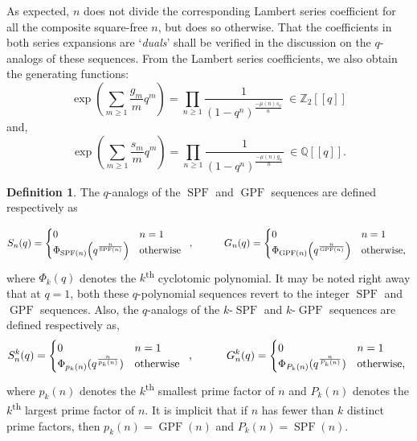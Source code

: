 \documentclass{article}
\numberwithin{equation}{section}
\theoremstyle{definition}
\newtheorem{definition}{\bf {Definition}}[section]
\begin{document}
As expected, $n$ does not divide the corresponding Lambert series coefficient for all the composite square-free $n$, but does so otherwise. That the coefficients in both series expansions are `\textit{duals}' shall be verified in the discussion on the $q$-analogs of these sequences. From the Lambert series coefficients, we also obtain the generating functions:  
\[\exp\left(\sum_{m\geq1}\frac{g_m}{m}q^m\right)=\prod_{n\geq1}\frac{1}{(1-q^n)^\frac{-\mu(n)s_n}{n}}\ \in \mathbb{Z}_{2}[[q]]\] 
and, 
\[\exp\left(\sum_{m\geq1}\frac{s_m}{m}q^m\right)=\prod_{n\geq1}\frac{1}{(1-q^n)^\frac{-\mu(n)g_n}{n}}\ \in \mathbb{Q}[[q]].\]


\begin{definition}
    The $q$-analogs of the $\operatorname{SPF}$ and $\operatorname{GPF}$ sequences are defined respectively as 
 
\[S_n(q)=\begin{cases}
        0 & n=1\\
        \Phi_{\operatorname{SPF}(n)}\!\left(q^\frac{n}{\operatorname{SPF}(n)}\right) & \text{otherwise}
    \end{cases}
\hspace{2mm}\text{, }\hspace{10mm}G_n(q)=\begin{cases}
        0 & n=1\\
        \Phi_{\operatorname{GPF}(n)}\!\left(q^\frac{n}{\operatorname{GPF}(n)}\right) & \text{otherwise}\text{, }
    \end{cases}\]
 where $\Phi_k(q)$ denotes the $k$\textsuperscript{th} cyclotomic polynomial. It may be noted right away that at $q=1$, both these $q$-polynomial sequences revert to the integer $\operatorname{SPF}$ and $\operatorname{GPF}$ sequences. Also, the $q$-analogs of the $k$-$\operatorname{SPF}$ and $k$-$\operatorname{GPF}$ sequences are defined respectively as, 
 \[S_n^k(q)=\begin{cases}
        0 & n=1\\
        \Phi_{p_k(n)}(q^\frac{n}{p_k(n)}) & \text{otherwise}
    \end{cases}
\hspace{2mm}\text{, }\hspace{10mm}
G_n^k(q)=\begin{cases}
        0 & n=1\\
        \Phi_{P_k(n)}(q^\frac{n}{P_k(n)}) & \text{otherwise}\text{, }
    \end{cases}\]
where $p_k(n)$ denotes the $k$\textsuperscript{th} smallest prime factor of $n$ and $P_k(n)$ denotes the $k$\textsuperscript{th} largest prime factor of $n$. It is implicit that if $n$ has fewer than $k$ distinct prime factors, then $p_k(n)=\operatorname{GPF}(n)$ and $P_k(n)=\operatorname{SPF}(n)$.
\end{definition}
\end{document}
